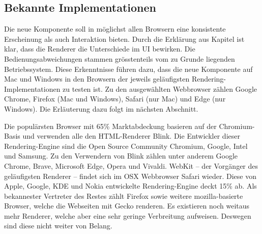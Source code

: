 \subsection{Bekannte Implementationen}
\label{sec:implementationsRenderer}

Die neue Komponente soll in möglichst allen Browsern eine konsistente Erscheinung als auch Interaktion bieten. 
Durch die Erklärung aus Kapitel \textbf{} ist klar, dass die Renderer die Unterschiede im UI bewirken. 
Die Bedienungsabweichungen stammen grösstenteils vom zu Grunde liegenden Betriebssystem. 
Diese Erkenntnisse führen dazu, dass die neue Komponente auf Mac und Windows in den Browsern der jeweils geläufigsten Rendering-Implementationen zu testen ist. 
Zu den ausgewählten Webbrowser zählen Google Chrome, Firefox (Mac und Windows), Safari (nur Mac) und Edge (nur Windows). 
Die Erläuterung dazu folgt im nächsten Abschnitt. 

Die populärsten Browser mit 65\% Marktabdeckung basieren auf der Chromium-Basis und verwenden alle den HTML-Renderer Blink. 
Die Entwickler dieser Rendering-Engine sind die Open Source Community Chromium, Google, Intel und Samsung. 
Zu den Verwendern von Blink zählen unter anderem Google Chrome, Brave, Microsoft Edge, Opera und Vivaldi. 
WebKit – der Vorgänger des geläufigsten Renderer – findet sich im OSX Webbrowser Safari wieder. 
Diese von Apple, Google, KDE und Nokia entwickelte Rendering-Engine deckt 15\% ab. 
Als bekannester Vertreter des Restes zählt Firefox sowie weitere mozilla-basierte Browser, welche die Webseiten mit Gecko renderen. 
Es existieren noch weitaus mehr Renderer, welche aber eine sehr geringe Verbreitung aufweisen. 
Deswegen sind diese nicht weiter von Belang. 
